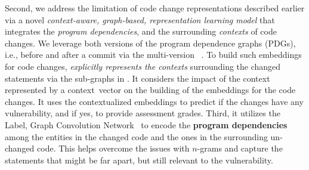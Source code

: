 Second, we address the limitation of code change representations described earlier via
a novel
{\em context-aware, graph-based, representation learning model}
that
integrates the {\em program dependencies}, and the surrounding {\em
  contexts} of code changes. We leverage both versions of the program
dependence graphs (PDGs), i.e., before and after a commit via the multi-version {\mvpdg}~\cite{flexeme-fse20}. To build such embeddings
for code changes, {\tool} {\em explicitly represents the contexts}
surrounding the changed statements via the sub-graphs in {\mvpdg}. It
considers the impact of the context represented by a
context~vector on the building of the embeddings for the code
changes. It uses the contextualized embeddings to predict if the
changes have any vulnerability, and if yes, to provide assessment
grades. Third, it utilizes the Label, Graph Convolution
Network~\cite{label-gcn} to encode the {\bf program dependencies}
among the entities in the changed code and the ones in the surrounding
un-changed code. This helps overcome the issues with $n$-grams and
capture the statements that might be far apart, but still relevant to the
vulnerability.

